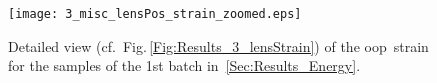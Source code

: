 \begin{figure}[ht]
    \centering
    \texttt{[image: 3\_misc\_lensPos\_strain\_zoomed.eps]}    
    \caption{Detailed view (cf.~Fig.\,\ref{Fig:Results_3_lensStrain}) of the \gls{oop}\ strain for the samples of the 1st batch in~\ref{Sec:Results_Energy}.}
    \label{Fig:App_3_lensStrain_zoomed}
\end{figure}